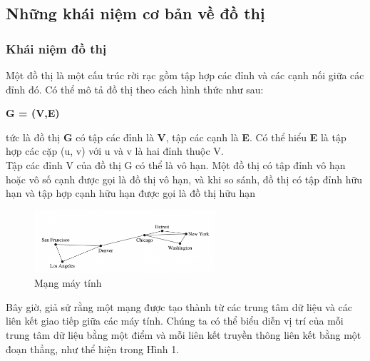 \subsection{Những khái niệm cơ bản về đồ thị}
\subsubsection{Khái niệm đồ thị}
Một đồ thị là một cấu trúc rời rạc gồm tập hợp các đỉnh và các cạnh nối giữa các đỉnh đó. Có thể mô tả đồ thị theo cách hình thức như sau:\\
\centerline{\textbf{G = (V,E)}}
tức là đồ thị \textbf{G} có tập các đỉnh là \textbf{V}, tập các cạnh là \textbf{E}. Có thể hiểu \textbf{E} là tập hợp các cặp (u, v) với u và v là hai đỉnh thuộc V.\\
Tập các đỉnh V của đồ thị G có thể là vô hạn. Một đồ thị có tập đỉnh vô hạn hoặc vô số cạnh được gọi là đồ thị vô hạn, và khi so sánh, đồ thị có tập đỉnh hữu hạn và tập hợp cạnh hữu hạn được gọi là đồ thị hữu hạn
\begin{figure}[H] %
    \centering %
    \includegraphics[width=0.6\textwidth]{assets/computer_network.png} 
    \caption{Mạng máy tính} %
    \label{fig:gr_1.1.1}
\end{figure}
Bây giờ, giả sử rằng một mạng được tạo thành từ các trung tâm dữ liệu và các liên kết giao tiếp giữa các máy tính. Chúng ta có thể biểu diễn vị trí của mỗi trung tâm dữ liệu bằng một điểm và mỗi liên kết truyền thông liên kết bằng một đoạn thẳng, như thể hiện trong Hình 1.\\
